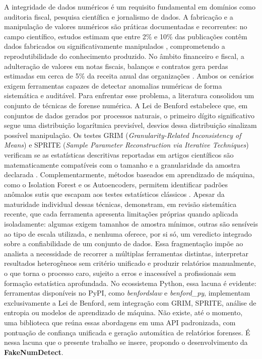\documentclass[
    12pt,                %
    openright,           %
    oneside,             %
    a4paper,             %
    english,             %
    brazil               %
]{abntex2}
\begin{document}
A integridade de dados numéricos é um requisito fundamental em domínios como auditoria fiscal, pesquisa científica e jornalismo de dados. A fabricação e a manipulação de valores numéricos são práticas documentadas e recorrentes: no campo científico, estudos estimam que entre 2\% e 10\% das publicações contêm dados fabricados ou significativamente manipulados \cite{Simonsohn2013}, comprometendo a reprodutibilidade do conhecimento produzido. No âmbito financeiro e fiscal, a adulteração de valores em notas fiscais, balanços e contratos gera perdas estimadas em cerca de 5\% da receita anual das organizações \cite{Ustinova2022}. Ambos os cenários exigem ferramentas capazes de detectar anomalias numéricas de forma sistemática e auditável.
Para enfrentar esse problema, a literatura consolidou um conjunto de técnicas de forense numérica. A Lei de Benford \cite{Benford1938} estabelece que, em conjuntos de dados gerados por processos naturais, o primeiro dígito significativo segue uma distribuição logarítmica previsível, desvios dessa distribuição sinalizam possível manipulação. Os testes GRIM (\textit{Granularity-Related Inconsistency of Means}) e SPRITE (\textit{Sample Parameter Reconstruction via Iterative Techniques}) verificam se as estatísticas descritivas reportadas em artigos científicos são matematicamente compatíveis com o tamanho e a granularidade da amostra declarada \cite{BrownHeathers2017, Heathers2018}. Complementarmente, métodos baseados em aprendizado de máquina, como o Isolation Forest e os Autoencoders, permitem identificar padrões anômalos sutis que escapam aos testes estatísticos clássicos \cite{Ndibe2025}.
Apesar da maturidade individual dessas técnicas,  demonstram, em revisão sistemática recente, que cada ferramenta apresenta limitações próprias quando aplicada isoladamente: algumas exigem tamanhos de amostra mínimos, outras são sensíveis ao tipo de escala utilizada, e nenhuma oferece, por si só, um veredicto integrado sobre a confiabilidade de um conjunto de dados. Essa fragmentação impõe ao analista a necessidade de recorrer a múltiplas ferramentas distintas, interpretar resultados heterogêneos sem critério unificado e produzir relatórios manualmente, o que torna o processo caro, sujeito a erros e inacessível a profissionais sem formação estatística aprofundada.
No ecossistema Python, essa lacuna é evidente: ferramentas disponíveis no PyPI, como \textit{benfordslaw} e \textit{benford\_py}, implementam exclusivamente a Lei de Benford, sem integração com GRIM, SPRITE, análise de entropia ou modelos de aprendizado de máquina. Não existe, até o momento, uma biblioteca que reúna essas abordagens em uma API padronizada, com pontuação de confiança unificada e geração automática de relatórios forenses. É nessa lacuna que o presente trabalho se insere, propondo o desenvolvimento da \textbf{FakeNumDetect}.
\end{document}
